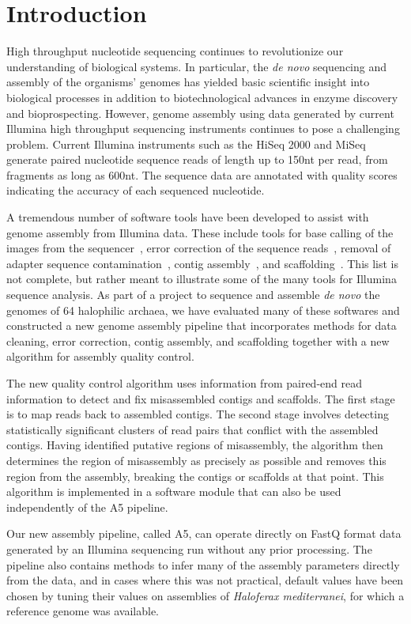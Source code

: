 \documentclass{bioinfo}
\begin{document}
\section{Introduction}
High throughput nucleotide sequencing continues to revolutionize our understanding of biological systems. In particular,
the \textit{de novo} sequencing and assembly of the organisms' genomes has yielded basic scientific insight into biological processes
in addition to biotechnological advances in enzyme discovery and bioprospecting.  However,
genome assembly using data generated by current Illumina high throughput sequencing instruments continues to pose a 
challenging problem. Current Illumina instruments such as the HiSeq 2000 and MiSeq generate paired nucleotide 
sequence reads of length up to 150nt per read, from fragments as long as 600nt. The sequence data are annotated with
quality scores indicating the accuracy of each sequenced nucleotide.

A tremendous number of software tools have been developed to assist with genome assembly from Illumina data.
These include tools for base calling of the images from the sequencer~\citep{bayescall,ibis},
error correction of the sequence reads~\citep{quake,shrec}, removal of adapter sequence contamination~\citep{tagdust},
contig assembly~\citep{vcake,euler-sr,}, and scaffolding~\citep{bambus2,SSPACE,SOPRA}.
This list is not complete, but rather meant to illustrate some of the many tools for Illumina sequence analysis.
As part of a project to sequence and assemble \textit{de novo} the genomes of 64 halophilic archaea, we have
evaluated many of these softwares and constructed a new genome assembly pipeline that incorporates
methods for data cleaning, error correction, contig assembly, and scaffolding together with a new algorithm
for assembly quality control. 

The new quality control algorithm uses information from paired-end read information
to detect and fix misassembled contigs and scaffolds. The first stage is to map reads back to assembled contigs.
The second stage involves detecting statistically significant clusters of read pairs that conflict with the
assembled contigs. Having identified putative regions of misassembly, the algorithm then determines the 
region of misassembly as precisely as possible and removes this region from the assembly, breaking the contigs
or scaffolds at that point. This algorithm is implemented in a software module that can also be used 
independently of the A5 pipeline.

Our new assembly pipeline, called A5, can operate directly on FastQ format data generated by an Illumina sequencing run
without any prior processing. The pipeline also contains methods to infer many of the assembly parameters directly
from the data, and in cases where this was not practical, default values have been chosen by tuning their values on 
assemblies of \textit{Haloferax mediterranei}, for which a reference genome was available.
\end{document}
